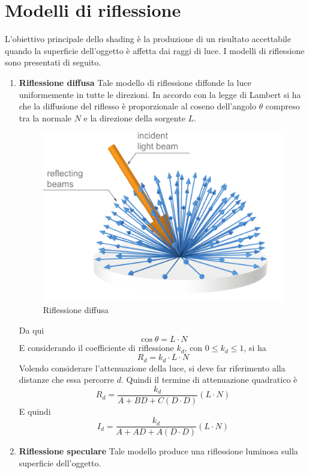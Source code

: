 \documentclass[9pt,a4paper,twoside]{tau}
\begin{document}
\section{Modelli di riflessione}
L'obiettivo principale dello shading è la produzione di un risultato accettabile quando la superficie dell'oggetto è affetta dai raggi di luce. I modelli di riflessione sono presentati di seguito.
\begin{enumerate}
	\item \textbf{Riflessione diffusa} Tale modello di riflessione diffonde la luce uniformemente in tutte le direzioni. In accordo con la legge di Lambert si ha che la diffusione del riflesso è proporzionale al coseno dell'angolo $\theta$ compreso tra la normale $N$ e la direzione della sorgente $L$. 
		\begin{figure}[H]
	        \centering
	        \includegraphics[width=0.6\columnwidth]{Figures/05.png}
	        \caption{Riflessione diffusa}
	        \label{fig:figure}
		\end{figure}
		Da qui
		\begin{equation*}
			\cos{\theta} = L \cdot N
		\end{equation*}
		E considerando il coefficiente di riflessione $k_d$, con $0\leq k_d \leq 1$, si ha
		\begin{equation*}
			R_d = k_d \cdot L \cdot N
		\end{equation*}
		Volendo considerare l'attenuazione della luce, si deve far riferimento alla distanze che essa percorre $d$. Quindi il termine di attenuazione quadratico è
		\begin{equation*}
			R_d = \frac{k_d}{A + BD + C(D \cdot D)}(L \cdot N)
		\end{equation*}
		E quindi
		\begin{equation*}
			I_d = \frac{k_d}{A + AD + A(D\cdot D)}(L \cdot N)
		\end{equation*}
	\item \textbf{Riflessione speculare} Tale modello produce una riflessione luminosa sulla superficie dell'oggetto.

\end{enumerate}
\end{document}
